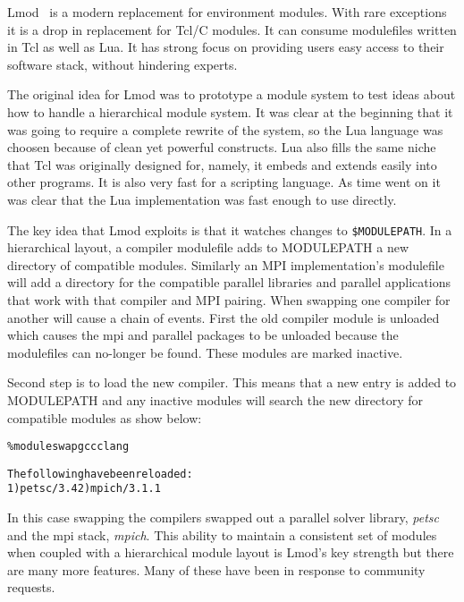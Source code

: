 Lmod~\cite{laytonLmod,taccSecretSauce,taccLmod} is a modern
replacement for environment modules.  With rare exceptions it is a
drop in replacement for Tcl/C modules. It can consume modulefiles
written in Tcl as well as Lua\cite{LuaBook}.  It has strong focus on
providing users easy access to their software stack, without hindering
experts.  

The original idea for Lmod was to prototype a module system to test
ideas about how to handle a hierarchical module system.  It was clear
at the beginning that it was going to require a complete rewrite of
the system, so the Lua language was choosen because of clean yet
powerful constructs.  Lua also fills the same niche that Tcl was
originally designed for, namely, it embeds and extends easily into
other programs.  It is also very fast for a scripting language.  As
time went on it was clear that the Lua implementation was fast enough
to use directly.  


The key idea that Lmod exploits is that it watches changes to
\texttt{\$MODULEPATH}.  In a hierarchical layout, a compiler modulefile adds to
MODULEPATH a new directory of compatible modules.  Similarly an MPI
implementation's modulefile will add a directory for the compatible
parallel libraries and parallel applications that work with that
compiler and MPI pairing.  When swapping one compiler for another will
cause a chain of events.  First the old compiler module is unloaded
which causes the mpi and parallel packages to be unloaded because the
modulefiles can no-longer be found.  These modules are marked
inactive.

Second step is to load the new compiler.  This means that a new entry
is added to MODULEPATH and any inactive modules will search the new
directory for compatible modules as show below:
{\small
  \begin{alltt}
    \% module swap gcc clang

    The following have been reloaded:
    1) petsc/3.4  2) mpich/3.1.1
      
\end{alltt}
}
\noindent
In this case swapping the compilers swapped out a parallel solver
library, \emph{petsc} and the mpi stack, \emph{mpich}. This ability
to maintain a consistent set of modules when coupled with a
hierarchical module layout is Lmod's key strength but there are many
more features.  Many of these have been in response to community
requests.  

